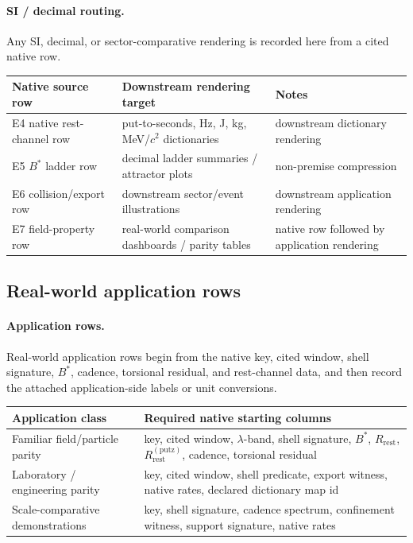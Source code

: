 \paragraph{SI / decimal routing.} Any SI, decimal, or sector-comparative rendering is recorded here from a cited native row.

\begin{center}
\begin{tabularx}{\linewidth}{@{}lXl@{}}
\toprule
Native source row & Downstream rendering target & Notes \\
\midrule
E4 native rest-channel row & put-to-seconds, Hz, J, kg, MeV/$c^2$ dictionaries & downstream dictionary rendering \\
E5 $B^*$ ladder row & decimal ladder summaries / attractor plots & non-premise compression \\
E6 collision/export row & downstream sector/event illustrations & downstream application rendering \\
E7 field-property row & real-world comparison dashboards / parity tables & native row followed by application rendering \\
\bottomrule
\end{tabularx}
\end{center}

\subsection{Real-world application rows}\label{app:realworld-routing}
\paragraph{Application rows.} Real-world application rows begin from the native key, cited window, shell signature, $B^*$, cadence, torsional residual, and rest-channel data, and then record the attached application-side labels or unit conversions.

\begin{center}
\begin{tabularx}{\linewidth}{@{}lX@{}}
\toprule
Application class & Required native starting columns \\
\midrule
Familiar field/particle parity & key, cited window, $\lambda$-band, shell signature, $B^*$, $R_{\mathrm{rest}}$, $R^{(\mathrm{putz})}_{\mathrm{rest}}$, cadence, torsional residual \\
Laboratory / engineering parity & key, cited window, shell predicate, export witness, native rates, declared dictionary map id \\
Scale-comparative demonstrations & key, shell signature, cadence spectrum, confinement witness, support signature, native rates \\
\bottomrule
\end{tabularx}
\end{center}



